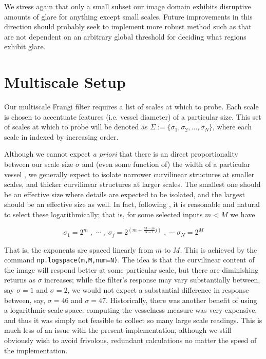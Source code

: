     
    We stress again that only a small subset our image domain exhibits disruptive amounts of glare for anything except small scales. Future improvements in this direction should probably seek to implement more robust method such as \cite{lange2005glare} that are not dependent on an arbitrary global
    threshold for deciding what regions exhibit glare.
    
    
\section{Multiscale Setup}

    Our multiscale Frangi filter requires a list of scales at which to probe. Each scale is chosen to accentuate features (i.e. vessel diameter) of a particular size.
    This set of scales at which to probe will be denoted as $\Sigma := \{ \sigma_1, \sigma_2, \dots, \sigma_N\}$, where each scale in indexed by increasing order.
    
    Although we cannot expect \textit{a priori} that there is an direct proportionality between our scale size $\sigma$ and (even some function of) the width of a particular vessel \cite{frangi-paper}, we generally expect to isolate
    narrower curvilinear structures at smaller scales, and thicker curvilinear structures at larger scales.  The smallest one should be an effective size where details are expected to be isolated, and the largest should be an effective size as well. In fact, following \cite{Koenderink}, it is reasonable and natural to select these logarithmically; that is, for some selected inputs $m < M$ we have
    
    \begin{equation}
    \sigma_1 = 2^{m} \; , \; \cdots \; , \; \sigma_{j} = 2^{\left(m+\frac{M-m}{N-1}j\right)} \; , \; \cdots \; \sigma_N = 2^{M} \end{equation}
    
    That is, the exponents are spaced linearly from $m$ to $M$. This is achieved by the command
    \texttt{np.logspace(m,M,num=N)}. The idea is that the curvilinear content of the image will respond better at some particular scale, but there are diminishing returns as $\sigma$ increases; while the filter's response may vary substantially between, say $\sigma=1$ and $\sigma=2$, we would not expect a substantial difference in response between, say, $\sigma=46$ and $\sigma=47$. Historically, there was another benefit of using a logarithmic scale space: computing the vesselness measure was very expensive, and thus it was simply not feasible to collect so many large scale readings. This is much less of an issue with the present implementation, although we still obviously wish to avoid frivolous, redundant calculations no matter the speed of the implementation.
    
